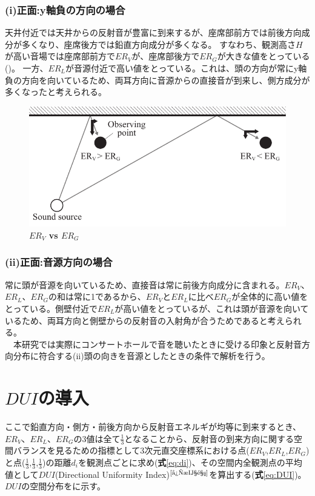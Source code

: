 


\subsubsection{(i)正面:y軸負の方向の場合}
天井付近では天井からの反射音が豊富に到来するが、座席部前方では前後方向成分が多くなり、座席後方では鉛直方向成分が多くなる。
すなわち、観測高さ$H$が高い音場では座席部前方で$ER_V$が、座席部後方で$ER_G$が大きな値をとっている()。
一方、$ER_L$が音源付近で高い値をとっている。これは、頭の方向が常にy軸負の方向を向いているため、両耳方向に音源からの直接音が到来し、側方成分が多くなったと考えられる。
\\
\begin{figure}[htbp]
    \centering
    \includegraphics[keepaspectratio,scale=1]{05_att/er_reason.pdf}
    \caption{\hspace{1mm}\textbf{$ER_V$ vs $ER_G$}}
    \label{fig:er_reason}
\end{figure}

\subsubsection{(ii)正面:音源方向の場合}
常に頭が音源を向いているため、直接音は常に前後方向成分に含まれる。$ER_V$、$ER_L$、$ER_G$の和は常に1であるから、$ER_V$と$ER_L$に比べ$ER_G$が全体的に高い値をとっている。側壁付近で$ER_L$が高い値をとっているが、これは頭が音源を向いているため、両耳方向と側壁からの反射音の入射角が合うためであると考えられる。
\\　本研究では実際にコンサートホールで音を聴いたときに受ける印象と反射音方向分布に符合する(ii)頭の向きを音源としたときの条件で解析を行う。

\pagebreak
\section{$DUI$の導入}
ここで鉛直方向・側方・前後方向から反射音エネルギが均等に到来するとき、$ER_V$、$ER_L$、$ER_G$の3値は全て$\frac{1}{3}$となることから、反射音の到来方向に関する空間バランスを見るための指標として3次元直交座標系における点($ER_V$,$ER_L$,$ER_G$)と点($\frac{1}{3}$,$\frac{1}{3}$,$\frac{1}{3}$)の距離$d_i$を観測点ごとに求め(\textbf{式}\ref{eq:di})、その空間内全観測点の平均値として$DUI$(Directional Uniformity Index)$^{\text{\cite{後期音}}}$を算出する(\textbf{式}\ref{eq:DUI})。$DUI$の空間分布をに示す。

